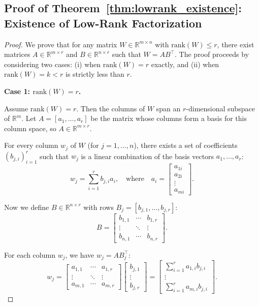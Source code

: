\documentclass{article}
\theoremstyle{plain}
\theoremstyle{definition}
\theoremstyle{remark}
\begin{document}
\subsection{Proof of Theorem~\ref{thm:lowrank_existence}: Existence of Low-Rank Factorization}\label{app:factorization_proof}

\begin{proof}
We prove that for any matrix $W \in \mathbb{R}^{m \times n}$ with $\mathrm{rank}(W) \leq r$, there exist matrices $A \in \mathbb{R}^{m \times r}$ and $B \in \mathbb{R}^{n \times r}$ such that $W = AB^\top$. The proof proceeds by considering two cases: (i) when $\mathrm{rank}(W) = r$ exactly, and (ii) when $\mathrm{rank}(W) = k < r$ is strictly less than $r$.

\textbf{Case 1: $\mathrm{rank}(W) = r$.}

Assume $\mathrm{rank}(W) = r$. Then the columns of $W$ span an $r$-dimensional subspace of $\mathbb{R}^m$. Let $A = [a_1, \ldots, a_r]$ be the matrix whose columns form a basis for this column space, so $A \in \mathbb{R}^{m \times r}$.

For every column $w_j$ of $W$ (for $j = 1, \ldots, n$), there exists a set of coefficients $(b_{j,i})_{i=1}^r$ such that $w_j$ is a linear combination of the basis vectors $a_1, \ldots, a_r$:
\[
w_j = \sum_{i=1}^r b_{j,i} a_i, \quad \text{where} \quad a_i =
\begin{bmatrix}
a_{1i}\\
a_{2i}\\
\vdots\\
a_{mi}
\end{bmatrix}.
\]

Now we define $B \in \mathbb{R}^{n \times r}$ with rows $B_j = [b_{j,1}, \ldots, b_{j,r}]$:
\[
B = \begin{bmatrix}
b_{1,1} & \cdots & b_{1,r} \\
\vdots & \ddots & \vdots \\
b_{n,1} & \cdots & b_{n,r}
\end{bmatrix}.
\]

For each column $w_j$, we have $w_j = A B_j^\top$:
\[
w_j = \begin{bmatrix}
a_{1,1} & \cdots & a_{1,r} \\
\vdots & \ddots & \vdots \\
a_{m,1} & \cdots & a_{m,r}
\end{bmatrix} \begin{bmatrix}
b_{j,1} \\
\vdots \\
b_{j,r}
\end{bmatrix}
= \begin{bmatrix}
\sum_{i=1}^r a_{1,i} b_{j,i} \\
\vdots \\
\sum_{i=1}^r a_{m,i} b_{j,i}
\end{bmatrix}.
\]


\end{proof}
\end{document}
